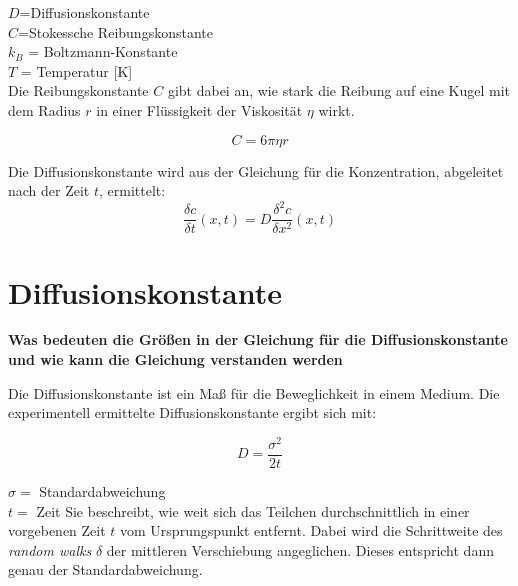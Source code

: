 \documentclass[a4paper, 12pt]{article}
\begin{document}
\noindent $D$=Diffusionskonstante\\
\noindent $C$=Stokessche Reibungskonstante\\
\noindent $k_B$ = Boltzmann-Konstante\\
\noindent $T$ = Temperatur [K]\\

Die Reibungskonstante $C$ gibt dabei an, wie stark die Reibung auf eine Kugel mit dem Radius $r$ in einer Flüssigkeit der Viskosität $\eta$ wirkt. 

\begin{equation}
C = 6\pi\eta r
\end{equation}

Die Diffusionskonstante wird aus der Gleichung für die Konzentration, abgeleitet nach der Zeit $t$, ermittelt:
\begin{equation}
\frac{\delta c}{\delta t}(x,t) = D \frac{\delta^2 c}{\delta x^2}(x,t)
\end{equation}

\section{Diffusionskonstante}
\textbf{Was bedeuten die Größen in der Gleichung für die Diffusionskonstante und wie kann
die Gleichung verstanden werden}

Die Diffusionskonstante ist ein Maß für die Beweglichkeit in einem Medium. Die experimentell ermittelte Diffusionskonstante ergibt sich mit:

\begin{equation}
D= \frac{\sigma^2}{2t}
\end{equation}

\noindent $\sigma =$ Standardabweichung\\
\noindent $t =$ Zeit
Sie beschreibt, wie weit sich das Teilchen durchschnittlich in einer vorgebenen Zeit $t$ vom Ursprungspunkt entfernt. Dabei wird die Schrittweite des \textit{random walks} $\delta$ der mittleren Verschiebung angeglichen. Dieses entspricht dann genau der Standardabweichung.
\end{document}
